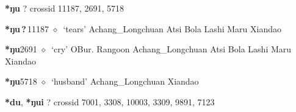\item
\textbf{*ŋu}
?
  {\tiny crossid 11187, 2691, 5718}
  \begin{list}{}{\leftmargin=1.5em \itemindent=-1.5em}
  \item {\footnotesize \textbf{*ŋu\,?\,}}{\tiny 11187}
         $\diamond$~`tears'
         Achang\_Longchuan 
\hspace{1ex}
         Atsi 
\hspace{1ex}
         Bola 
\hspace{1ex}
         Lashi 
\hspace{1ex}
         Maru 
\hspace{1ex}
         Xiandao 
  \item {\footnotesize \textbf{*ŋu}}{\tiny 2691}
\hspace{1ex}
         $\diamond$~`cry'
         OBur. 
\hspace{1ex}
         Rangoon 
\hspace{1ex}
         Achang\_Longchuan 
\hspace{1ex}
         Atsi 
\hspace{1ex}
         Bola 
\hspace{1ex}
         Lashi 
\hspace{1ex}
         Maru 
\hspace{1ex}
         Xiandao 
  \item {\footnotesize \textbf{*ŋu}}{\tiny 5718}
\hspace{1ex}
         $\diamond$~`husband'
         Achang\_Longchuan 
\hspace{1ex}
         Xiandao 
  \end{list}
\item
\textbf{*du}, \textbf{*ŋui}
?
  {\tiny crossid 7001, 3308, 10003, 3309, 9891, 7123}
